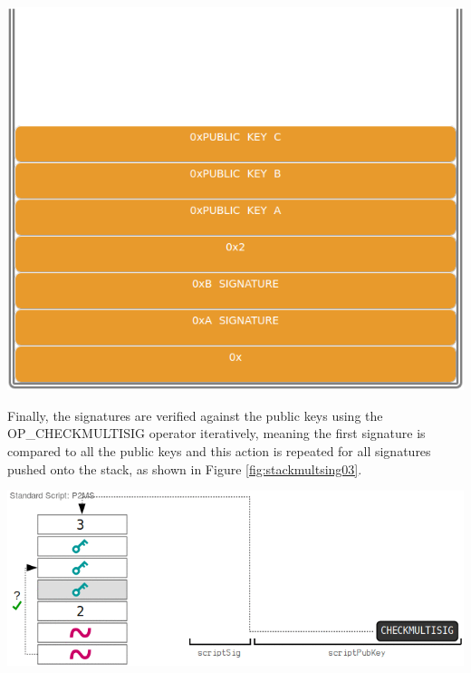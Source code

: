 \begin{example}
    {\centering
    \vspace{15pt}
    \includegraphics[scale=0.35]{imgs/script/multisig/2.png}
    \vspace{10pt}
    \par}
   
    Finally, the signatures are verified against the public keys using the 
    OP\_CHECKMULTISIG operator iteratively, meaning the first signature is compared to 
    all the public keys and this action is repeated for all signatures pushed onto the stack, 
    as shown in Figure \ref{fig:stackmultsing03}.
 
    {\centering
    \vspace{15pt}
    \includegraphics[scale=0.35]{imgs/script/multisig/3.png}
    \vspace{10pt}
    \par}

\end{example}

